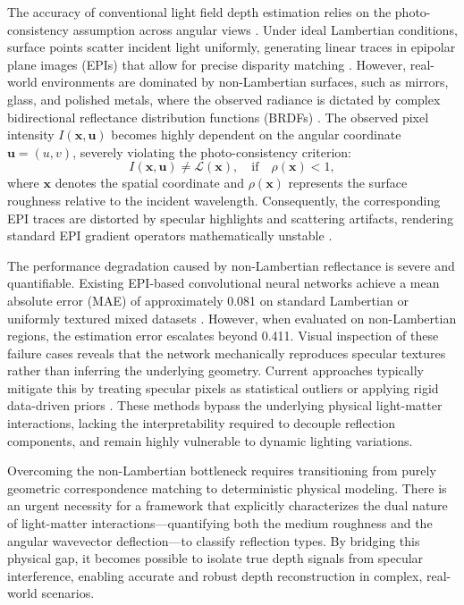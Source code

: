 \documentclass[lettersize,journal]{IEEEtran}
\begin{document}
The accuracy of conventional light field depth estimation relies on the photo-consistency assumption across angular views \cite{wanner2014}. Under ideal Lambertian conditions, surface points scatter incident light uniformly, generating linear traces in epipolar plane images (EPIs) that allow for precise disparity matching \cite{heber2018}. However, real-world environments are dominated by non-Lambertian surfaces, such as mirrors, glass, and polished metals, where the observed radiance is dictated by complex bidirectional reflectance distribution functions (BRDFs) \cite{blinn1977}. The observed pixel intensity $I(\mathbf{x}, \mathbf{u})$ becomes highly dependent on the angular coordinate $\mathbf{u} = (u, v)$, severely violating the photo-consistency criterion:
\begin{equation}
    I(\mathbf{x}, \mathbf{u}) \neq \mathcal{L}(\mathbf{x}), \quad \text{if} \quad \rho(\mathbf{x}) < 1,
\end{equation}
where $\mathbf{x}$ denotes the spatial coordinate and $\rho(\mathbf{x})$ represents the surface roughness relative to the incident wavelength. Consequently, the corresponding EPI traces are distorted by specular highlights and scattering artifacts, rendering standard EPI gradient operators mathematically unstable \cite{li2021}.

The performance degradation caused by non-Lambertian reflectance is severe and quantifiable. Existing EPI-based convolutional neural networks achieve a mean absolute error (MAE) of approximately 0.081 on standard Lambertian or uniformly textured mixed datasets \cite{lyu2022}. However, when evaluated on non-Lambertian regions, the estimation error escalates beyond 0.411. Visual inspection of these failure cases reveals that the network mechanically reproduces specular textures rather than inferring the underlying geometry. Current approaches typically mitigate this by treating specular pixels as statistical outliers \cite{zhang2023} or applying rigid data-driven priors \cite{peng2022}. These methods bypass the underlying physical light-matter interactions, lacking the interpretability required to decouple reflection components, and remain highly vulnerable to dynamic lighting variations.

Overcoming the non-Lambertian bottleneck requires transitioning from purely geometric correspondence matching to deterministic physical modeling. There is an urgent necessity for a framework that explicitly characterizes the dual nature of light-matter interactions—quantifying both the medium roughness and the angular wavevector deflection—to classify reflection types. By bridging this physical gap, it becomes possible to isolate true depth signals from specular interference, enabling accurate and robust depth reconstruction in complex, real-world scenarios.
\end{document}
